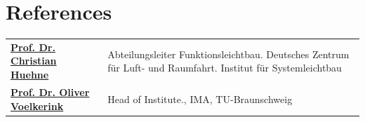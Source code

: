 \documentclass[a4paper,20pt]{article}
\begin{document}
\section{\color{blue}References}

\begin{tabular}{@{} p{6cm} p{10cm}@{}}
\textbf{\href{https://www.dlr.de/de/sy/ueber-uns/abteilungen-dlr-sy/dlr-sy-funktionsleichtbau}{Prof. Dr. Christian Huehne}} & Abteilungsleiter Funktionsleichtbau. Deutsches Zentrum für Luft- und Raumfahrt. Institut für Systemleichtbau \\
\textbf{\href{https://www.tu-braunschweig.de/ima/team/head-of-institute/prof-dr-ing-oliver-voelkerink}{Prof. Dr. Oliver Voelkerink}} & Head of Institute., IMA, TU-Braunschweig\\
\end{tabular}
\end{document}
